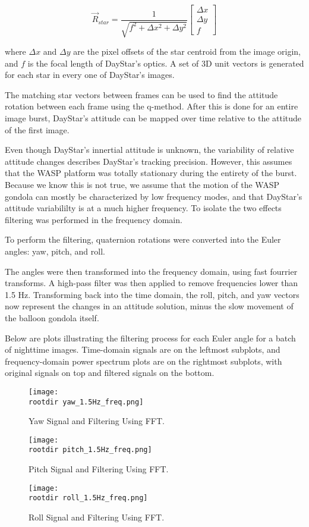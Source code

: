 \documentclass[twocolumn,letterpaper]{IEEEAerospace2012}
\newcommand{\rootdir}{./Figures/}
\begin{document}
\begin{equation}
\vec{R}_{star} = \frac{1}{\sqrt{f^2 + \Delta{x^2} + \Delta{y^2}}}
    \begin{bmatrix}
    \Delta{x} \\
    \Delta{y} \\
    f
    \end{bmatrix}
\end{equation}

where $\Delta{x}$ and $\Delta{y}$ are the pixel offsets of the star centroid from the image origin, and $f$ is the focal length of DayStar's optics. A set of 3D unit vectors is generated for each star in every one of DayStar's images.

The matching star vectors between frames can be used to find the attitude rotation between each frame using the q-method. After this is done for an entire image burst, DayStar's attitude can be mapped over time relative to the attitude of the first image.

Even though DayStar's innertial attitude is unknown, the variability of relative attitude changes describes DayStar's tracking precision. However, this assumes that the WASP platform was totally stationary during the entirety of the burst. Because we know this is not true, we assume that the motion of the WASP gondola can mostly be characterized by low frequency modes, and that DayStar's attitude variabililty is at a much higher frequency. To isolate the two effects filtering was performed in the frequency domain.

To perform the filtering, quaternion rotations were converted into the Euler angles: yaw, pitch, and roll.

The angles were then transformed into the frequency domain, using fast fourrier transforms. A high-pass filter was then applied to remove frequencies lower than 1.5 Hz. Transforming back into the time domain, the roll, pitch, and yaw vectors now represent the changes in an attitude solution, minus the slow movement of the balloon gondola itself.

Below are plots illustrating the filtering process for each Euler angle for a batch of nighttime images. Time-domain signals are on the leftmost subplots, and frequency-domain power spectrum plots are on the rightmost subplots, with original signals on top and filtered signals on the bottom.

\begin{figure*}
    \centering	
    \texttt{[image: \\rootdir yaw\_1.5Hz\_freq.png]}
    \caption{Yaw Signal and Filtering Using FFT.}
    \label{fig:Yaw Filtering}
\end{figure*}
\begin{figure*}
    \centering
    \texttt{[image: \\rootdir pitch\_1.5Hz\_freq.png]}
    \caption{Pitch Signal and Filtering Using FFT.}
    \label{fig:Pitch Filtering}
\end{figure*}
\begin{figure*}
    \centering
    \texttt{[image: \\rootdir roll\_1.5Hz\_freq.png]}
    \caption{Roll Signal and Filtering Using FFT.}
    \label{fig:Roll Filtering}
\end{figure*}
\end{document}
